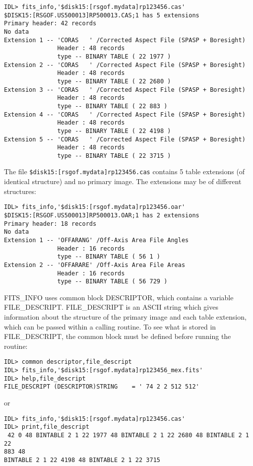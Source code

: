 \medskip\noindent
\begin{verbatim}
IDL> fits_info,'$disk15:[rsgof.mydata]rp123456.cas'
$DISK15:[RSGOF.US500013]RP500013.CAS;1 has 5 extensions
Primary header: 42 records
No data
Extension 1 -- 'CORAS   ' /Corrected Aspect File (SPASP + Boresight)
               Header : 48 records
               type -- BINARY TABLE ( 22 1977 )
Extension 2 -- 'CORAS   ' /Corrected Aspect File (SPASP + Boresight)
               Header : 48 records
               type -- BINARY TABLE ( 22 2680 )
Extension 3 -- 'CORAS   ' /Corrected Aspect File (SPASP + Boresight)
               Header : 48 records
               type -- BINARY TABLE ( 22 883 )
Extension 4 -- 'CORAS   ' /Corrected Aspect File (SPASP + Boresight)
               Header : 48 records
               type -- BINARY TABLE ( 22 4198 )
Extension 5 -- 'CORAS   ' /Corrected Aspect File (SPASP + Boresight)
               Header : 48 records
               type -- BINARY TABLE ( 22 3715 )
\end{verbatim}
The file {\tt \$disk15:[rsgof.mydata]rp123456.cas} contains 5 table extensions (of
identical structure) and no primary image. The extensions may be of different
structures:

\medskip\noindent
\begin{verbatim}
IDL> fits_info,'$disk15:[rsgof.mydata]rp123456.oar'
$DISK15:[RSGOF.US500013]RP500013.OAR;1 has 2 extensions
Primary header: 18 records
No data
Extension 1 -- 'OFFARANG' /Off-Axis Area File Angles
               Header : 16 records
               type -- BINARY TABLE ( 56 1 )
Extension 2 -- 'OFFARARE' /Off-Axis Area File Areas
               Header : 16 records
               type -- BINARY TABLE ( 56 729 )
\end{verbatim}
FITS{\_}INFO uses common block DESCRIPTOR, which contains a variable
FILE{\_}DESCRIPT. FILE{\_}DESCRIPT is an ASCII string which gives information about
the structure of the primary image and each table extension, which can be
passed within a calling routine. To see what is stored in FILE{\_}DESCRIPT, the
common block must be defined before running the routine:

\medskip\noindent
\begin{verbatim}
IDL> common descriptor,file_descript
IDL> fits_info,'$disk15:[rsgof.mydata]rp123456_mex.fits'
IDL> help,file_descript
FILE_DESCRIPT (DESCRIPTOR)STRING    = ' 74 2 2 512 512'
\end{verbatim}
or

\medskip\noindent
\begin{verbatim}
IDL> fits_info,'$disk15:[rsgof.mydata]rp123456.cas'
IDL> print,file_descript
 42 0 48 BINTABLE 2 1 22 1977 48 BINTABLE 2 1 22 2680 48 BINTABLE 2 1 22
883 48
BINTABLE 2 1 22 4198 48 BINTABLE 2 1 22 3715
\end{verbatim}
 

